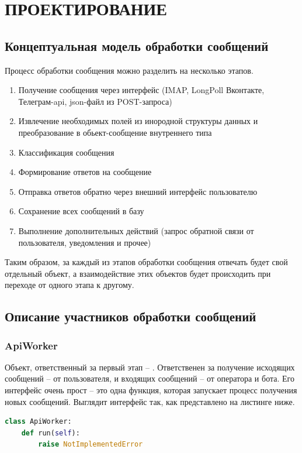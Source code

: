 \section{ПРОЕКТИРОВАНИЕ}
    \subsection{Концептуальная модель обработки сообщений}
    Процесс обработки сообщения можно разделить на несколько этапов.
    \begin{enumerate}
        \item Получение сообщения через интерфейс (IMAP, LongPoll Вконтакте, Телеграм-api, json-файл из POST-запроса)
        \item Извлечение необходимых полей из инородной структуры данных и преобразование в обьект-сообщение внутреннего типа
        \item Классификация сообщения
        \item Формирование ответов на сообщение
        \item Отправка ответов обратно через внешний интерфейс пользователю
        \item Сохранение всех сообщений в базу
        \item Выполнение дополнительных действий (запрос обратной связи от пользователя, уведомления и прочее)
    \end{enumerate}

    Таким образом, за каждый из этапов обработки сообщения отвечать будет свой отдельный объект,
    а взаимодействие этих объектов будет происходить при переходе от одного этапа к другому.
    
    \subsection{Описание участников обработки сообщений}
    \subsubsection*{ApiWorker}
    Объект, ответственный за первый этап -- . Ответственен за получение
    исходящих сообщений -- от пользователя, и входящих сообщений -- от оператора и бота.
    Его интерфейс очень прост -- это одна функция, которая запускает процесс получения новых сообщений.
    Выглядит интерфейс так, как представлено на листинге ниже.
\begin{lstlisting}[language=Python]
class ApiWorker:
    def run(self):
        raise NotImplementedError
\end{lstlisting}

